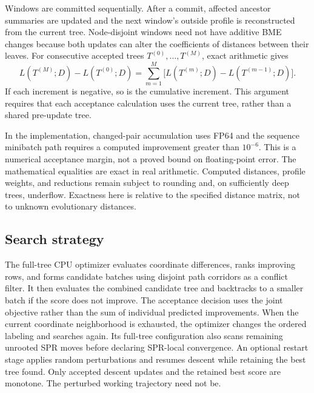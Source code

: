 \documentclass[11pt,a4paper]{article}
\makeatletter
\DeclareRobustCommand{\_}{\ifmmode\nfss@text{\textunderscore}\else\textunderscore\allowbreak\fi}
\theoremstyle{definition}
\makeatother
\begin{document}
Windows are committed sequentially.
After a commit, affected ancestor summaries are updated and the next window's outside profile is reconstructed from the current tree.
Node-disjoint windows need not have additive BME changes because both updates can alter the coefficients of distances between their leaves.
For consecutive accepted trees $T^{(0)},\ldots,T^{(M)}$, exact arithmetic gives
\begin{equation}
 L(T^{(M)};D)-L(T^{(0)};D)
 =\sum_{m=1}^M\bigl[L(T^{(m)};D)-L(T^{(m-1)};D)\bigr].
 \label{eq:telescoping}
\end{equation}
If each increment is negative, so is the cumulative increment.
This argument requires that each acceptance calculation uses the current tree, rather than a shared pre-update tree.

In the implementation, changed-pair accumulation uses FP64 and the sequence minibatch path requires a computed improvement greater than $10^{-6}$.
This is a numerical acceptance margin, not a proved bound on floating-point error.
The mathematical equalities are exact in real arithmetic.
Computed distances, profile weights, and reductions remain subject to rounding and, on sufficiently deep trees, underflow.
Exactness here is relative to the specified distance matrix, not to unknown evolutionary distances.

\subsection{Search strategy}
\label{sec:optimizer}

The full-tree CPU optimizer evaluates coordinate differences, ranks improving rows, and forms candidate batches using disjoint path corridors as a conflict filter.
It then evaluates the combined candidate tree and backtracks to a smaller batch if the score does not improve.
The acceptance decision uses the joint objective rather than the sum of individual predicted improvements.
When the current coordinate neighborhood is exhausted, the optimizer changes the ordered labeling and searches again.
Its full-tree configuration also scans remaining unrooted SPR moves before declaring SPR-local convergence.
An optional restart stage applies random perturbations and resumes descent while retaining the best tree found.
Only accepted descent updates and the retained best score are monotone.
The perturbed working trajectory need not be.
\end{document}
